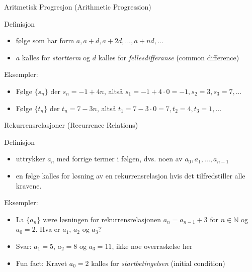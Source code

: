 \begin{frame}{Aritmetisk Progresjon (Arithmetic Progression)}
    \pause
    \begin{block}{Definisjon}
        \begin{itemize}
            \item følge som har form $a, a + d, a + 2d, ..., a + nd, ...$
            \item $a$ kalles for \textit{startterm} og $d$ kalles for \textit{fellesdifferanse} (common difference)
        \end{itemize}
    \end{block}
    \pause
    Eksempler:\\
    \begin{itemize}
        \item Følge $\{s_n\}$ der $s_n = -1 + 4n$, altså $s_1 = -1 + 4 \cdot 0 = -1, s_2 = 3, s_3 = 7, ...$
        \item Følge $\{t_n\}$ der $t_n = 7 - 3n$, altså $t_1 = 7 - 3 \cdot 0 = 7, t_2 = 4, t_3 = 1, ...$
    \end{itemize}
\end{frame}

\begin{frame}{Rekurrensrelasjoner (Recurrence Relations)}
    \begin{block}{Definisjon}
        \begin{itemize}
            \item uttrykker $a_n$ med forrige termer i følgen, dvs. noen av $a_0, a_1, ..., a_{n-1}$
            \item en følge kalles for løsning av en rekurrensrelasjon hvis det tilfredstiller alle kravene.
        \end{itemize}
    \end{block}
    \pause
    Eksempler:\\
    \begin{itemize}
        \item La $\{a_n\}$ være løsningen for rekurrensrelasjonen $a_n = a_{n-1} + 3$ for $n \in \mathbb{N}$ og $a_0 = 2$. Hva er $a_1$, $a_2$ og $a_3$?
        \pause
        \item Svar: $a_1 = 5$, $a_2 = 8$ og $a_3 = 11$, ikke noe overraskelse her
        \item Fun fact: Kravet $a_0 = 2$ kalles for \textit{startbetingelsen} (initial condition)
    \end{itemize}
\end{frame}

